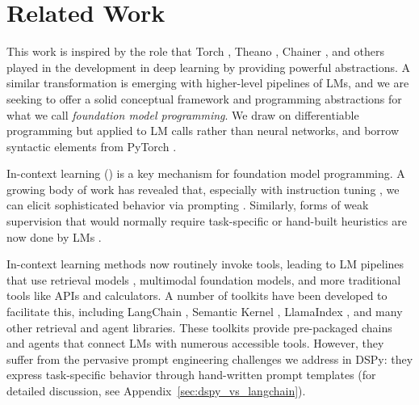 \section{Related Work}

This work is inspired by the role that %
Torch \citep{collobert2002torch},
Theano \citep{bergstra2010theano,bergstra2011theano,al2016theano},
Chainer \citep{tokui2015chainer}, and others
played in the development in deep learning by providing powerful abstractions. A similar transformation is emerging with higher-level pipelines of LMs, and
we are seeking to offer a solid conceptual framework and programming abstractions for %
what we call \textit{foundation model programming}.
We draw on differentiable programming \citep{wang2018differentiable} but applied to LM calls rather than neural networks, and borrow syntactic elements from PyTorch \citep{pytorch2019}.

In-context learning (\citealt{mccann2018natural,radford2018improving,brown2020language}) is a key mechanism for foundation model programming. A growing body of work has revealed that, especially with instruction tuning \citep{ouyang2022training}, we can elicit sophisticated behavior via prompting
\citep{%
wei2022chain,
wang2022self,
press2022measuring,
yao2022react,
khot2022decomposed,
madaan2023self}.
Similarly, forms of weak supervision that would normally require
task-specific
\citep{%
khattab2021baleen,
khattab2021relevance}
or
hand-built 
\citep{%
ratner2016snorkel,hancock2018training}
heuristics are now done by LMs
\citep{
wang2022self,
zelikman2022star,
zhang2022automatic,
shao2023synthetic}.

In-context learning methods now routinely invoke tools, leading to LM pipelines that use retrieval models
\citep{
chen-etal-2017-reading,
lewis2020rag,
guu2020realm,
lazaridou2022internet,
izacard2022few},
multimodal foundation models, and more traditional tools like
APIs
\citep{nakano21webgpt} and
calculators. A number of toolkits %
have been developed to facilitate this, including
LangChain \citep{chase2022langchain},
Semantic Kernel \citep{semantickernel},
LlamaIndex \citep{llamaindex2022}, and many other retrieval and agent libraries.
These toolkits provide pre-packaged chains and agents that connect LMs with numerous accessible tools. However, they suffer from the pervasive prompt engineering challenges we address in DSPy: they express task-specific behavior through hand-written prompt templates (for detailed discussion, see Appendix~\ref{sec:dspy_vs_langchain}). %

